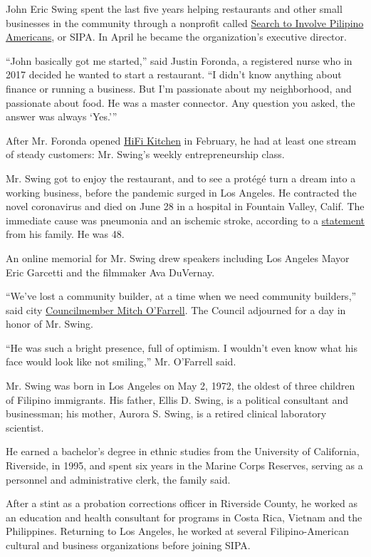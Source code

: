 John Eric Swing spent the last five years helping restaurants and other
small businesses in the community through a nonprofit called
\href{https://sipacares.org/}{Search to Involve Pilipino Americans}, or
SIPA. In April he became the organization's executive director.

``John basically got me started,'' said Justin Foronda, a registered
nurse who in 2017 decided he wanted to start a restaurant. ``I didn't
know anything about finance or running a business. But I'm passionate
about my neighborhood, and passionate about food. He was a master
connector. Any question you asked, the answer was always `Yes.'''

After Mr. Foronda opened \href{https://www.hifi-kitchen.com/}{HiFi
Kitchen} in February, he had at least one stream of steady customers:
Mr. Swing's weekly entrepreneurship class.

Mr. Swing got to enjoy the restaurant, and to see a protégé turn a dream
into a working business, before the pandemic surged in Los Angeles. He
contracted the novel coronavirus and died on June 28 in a hospital in
Fountain Valley, Calif. The immediate cause was pneumonia and an
ischemic stroke, according to a
\href{https://www.gofundme.com/f/john-eric039s-fight-with-covid}{statement}
from his family. He was 48.

An online memorial for Mr. Swing drew speakers including Los Angeles
Mayor Eric Garcetti and the filmmaker Ava DuVernay.

``We've lost a community builder, at a time when we need community
builders,'' said city \href{https://cd13.lacity.org/}{Councilmember
Mitch O'Farrell}. The Council adjourned for a day in honor of Mr. Swing.

``He was such a bright presence, full of optimism. I wouldn't even know
what his face would look like not smiling,'' Mr. O'Farrell said.

Mr. Swing was born in Los Angeles on May 2, 1972, the oldest of three
children of Filipino immigrants. His father, Ellis D. Swing, is a
political consultant and businessman; his mother, Aurora S. Swing, is a
retired clinical laboratory scientist.

He earned a bachelor's degree in ethnic studies from the University of
California, Riverside, in 1995, and spent six years in the Marine Corps
Reserves, serving as a personnel and administrative clerk, the family
said.

After a stint as a probation corrections officer in Riverside County, he
worked as an education and health consultant for programs in Costa Rica,
Vietnam and the Philippines. Returning to Los Angeles, he worked at
several Filipino-American cultural and business organizations before
joining SIPA.

